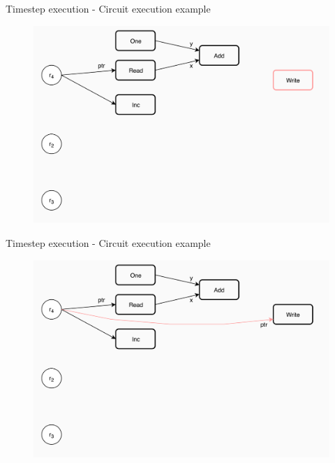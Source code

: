 \documentclass[xcolor={usenames}]{beamer}
\begin{document}
  \begin{frame}{Timestep execution - Circuit execution example}
  	\begin{figure}
  		\centering
  		\includegraphics[width=\textwidth]{../figures/example-circuit-9.png}
  	\end{figure}
  \end{frame}
  \begin{frame}{Timestep execution - Circuit execution example}
  	\begin{figure}
  		\centering
  		\includegraphics[width=\textwidth]{../figures/example-circuit-10.png}
  	\end{figure}
  \end{frame}
\end{document}

